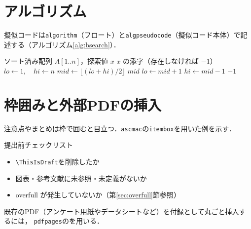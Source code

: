 \begin{lstlisting}[language={[LaTeX]TeX}, numbers=none, frame=single]

\end{lstlisting}

\section{アルゴリズム}
\label{sec:algorithm}
擬似コードは\texttt{algorithm}（フロート）と\texttt{algpseudocode}（擬似コード本体）で記述する（アルゴリズム\ref{alg:bsearch}）．

\begin{algorithm}[htbp]
    \caption{二分探索}
    \label{alg:bsearch}
    \begin{algorithmic}[1]
        \Require ソート済み配列 $A[1..n]$，探索値 $x$
        \Ensure $x$ の添字（存在しなければ $-1$）
        \State $lo \gets 1,\quad hi \gets n$
            \State $mid \gets \lfloor (lo + hi) / 2 \rfloor$
                \State \Return $mid$
                \State $lo \gets mid + 1$
            \Else
                \State $hi \gets mid - 1$
            \EndIf
        \EndWhile
        \State \Return $-1$
    \end{algorithmic}
\end{algorithm}

\section{枠囲みと外部PDFの挿入}
\label{sec:box}
注意点やまとめは枠で囲むと目立つ．\texttt{ascmac}の\texttt{itembox}を用いた例を示す．

\begin{itembox}[l]{提出前チェックリスト}
    \begin{itemize}
        \item \verb|\ThisIsDraft|を削除したか
        \item 図表・参考文献に未参照・未定義がないか
        \item overfull が発生していないか（第\ref{sec:overfull}節参照）
    \end{itemize}
\end{itembox}

既存のPDF（アンケート用紙やデータシートなど）を付録として丸ごと挿入するには，
\texttt{pdfpages}の\verb||を用いる．


